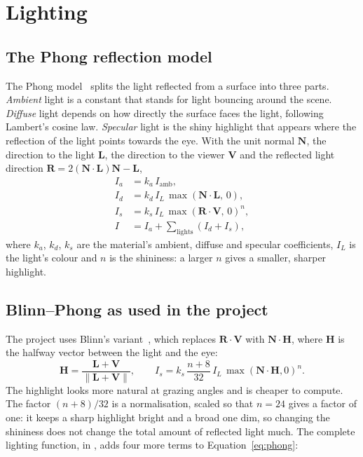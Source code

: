 \documentclass[11pt,a4paper]{report}
\newcommand{\code}[1]{\texttt{\detokenize{#1}}}
\newcommand{\vect}[1]{\mathbf{#1}}
\begin{document}
\section{Lighting}
\label{sec:lighting}

\subsection{The Phong reflection model}

The Phong model~\cite{phong} splits the light reflected from a surface into three
parts. \emph{Ambient} light is a constant that stands for light bouncing around the
scene. \emph{Diffuse} light depends on how directly the surface faces the light,
following Lambert's cosine law. \emph{Specular} light is the shiny highlight that
appears where the reflection of the light points towards the eye. With the unit
normal $\vect{N}$, the direction to the light $\vect{L}$, the direction to the viewer
$\vect{V}$ and the reflected light direction $\vect{R} = 2(\vect{N}\cdot\vect{L})\vect{N}-\vect{L}$,
\begin{align}
I_a &= k_a\, I_{\text{amb}}, \label{eq:amb}\\
I_d &= k_d\, I_L\, \max(\vect{N}\cdot\vect{L},\,0), \label{eq:diff}\\
I_s &= k_s\, I_L\, \max(\vect{R}\cdot\vect{V},\,0)^{n}, \label{eq:spec}\\
I &= I_a + \sum_{\text{lights}} \left(I_d + I_s\right), \label{eq:phong}
\end{align}
where $k_a$, $k_d$, $k_s$ are the material's ambient, diffuse and specular
coefficients, $I_L$ is the light's colour and $n$ is the shininess: a larger $n$ gives
a smaller, sharper highlight.

\subsection{Blinn--Phong as used in the project}

The project uses Blinn's variant~\cite{blinn}, which replaces $\vect{R}\cdot\vect{V}$
with $\vect{N}\cdot\vect{H}$, where $\vect{H}$ is the halfway vector between the light
and the eye:
\begin{equation}
\vect{H} = \frac{\vect{L}+\vect{V}}{\lVert\vect{L}+\vect{V}\rVert},\qquad
I_s = k_s\,\frac{n+8}{32}\,I_L\,\max(\vect{N}\cdot\vect{H},0)^{n}.
\end{equation}
The highlight looks more natural at grazing angles and is cheaper to compute. The
factor $(n+8)/32$ is a normalisation, scaled so that $n=24$ gives a factor of one: it
keeps a sharp highlight bright and a broad one dim, so changing the shininess does
not change the total amount of reflected light much. The complete lighting function,
\code{shade()} in \code{shaders/common.glsl}, adds four more terms to
Equation~\eqref{eq:phong}:
\end{document}
